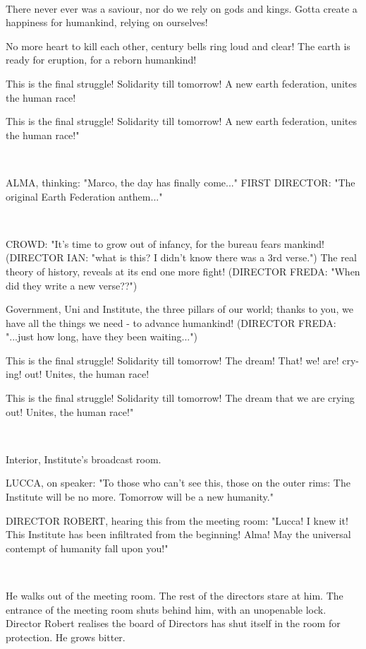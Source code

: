 \documentclass[11pt]{article}
\begin{document}
\ 

There never ever was a saviour,
nor do we rely on gods and kings.
Gotta create a happiness for humankind,
relying on ourselves!

No more heart to kill each other,
century bells ring loud and clear!
The earth is ready for eruption,
for a reborn humankind!

This is the final struggle! 
Solidarity till tomorrow!
A new earth federation,
unites the human race! 

This is the final struggle!
Solidarity till tomorrow!
A new earth federation,
unites the human race!"

\ 

ALMA, thinking: "Marco, the day has finally come..."
FIRST DIRECTOR: "The original Earth Federation anthem..."

\ 

CROWD: "It's time to grow out of infancy,
for the bureau fears mankind! (DIRECTOR IAN: "what is this? I didn't know there was a 3rd verse.")
The real theory of history, 
reveals at its end one more fight! (DIRECTOR FREDA: "When did they write a new verse??")

Government, Uni and Institute, 
the three pillars of our world;
thanks to you, we have all the things we need - 
to advance humankind! (DIRECTOR FREDA: "...just how long, have they been waiting...")

This is the final struggle!
Solidarity till tomorrow!
The dream! That! we! are! cry-ing! out!
Unites, the human race!

This is the final struggle!
Solidarity till tomorrow!
The dream that we are crying out!
Unites, the human race!"

\ 

Interior, Institute's broadcast room.

LUCCA, on speaker: "To those who can't see this, those on the outer rims: 
The Institute will be no more.
Tomorrow will be a new humanity."

DIRECTOR ROBERT, hearing this from the meeting room: "Lucca! 
I knew it! This Institute has been infiltrated from the beginning!
Alma! 
May the universal contempt of humanity fall upon you!"

\ 

He walks out of the meeting room. 
The rest of the directors stare at him.
The entrance of the meeting room shuts behind him, with an unopenable lock. 
Director Robert realises the board of Directors has shut itself in the room for protection. He grows bitter.
\end{document}
